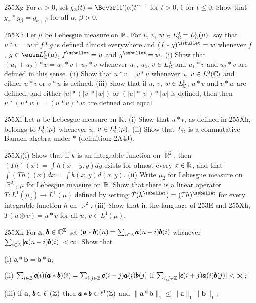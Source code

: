 {\sqheader 255Xg For $\alpha>0$, set
$g_{\alpha}(t)=\Bover1{\Gamma(\alpha)}t^{\alpha-1}$ for $t>0$, $0$ for
$t\le 0$.   Show that $g_{\alpha}*g_{\beta}=g_{\alpha+\beta}$ for all
$\alpha$, $\beta>0$.   

\sqheader 255Xh Let $\mu$ be Lebesgue measure on $\Bbb R$.
For $u$, $v$,
$w\in L^0_{\Bbb C}=L^0_{\Bbb C}(\mu)$, say that
$u*v=w$ if $f*g$ is defined almost everywhere and $(f*g)^{\ssbullet}=w$
whenever $f$, $g\in\eusm L^0_{\Bbb C}(\mu)$, $f^{\ssbullet}=u$ and
$g^{\ssbullet}=w$.   (i) Show that $(u_1+u_2)*v=u_1*v+u_2*v$ whenever
$u_1$, $u_2$, $v\in L^0_{\Bbb C}$ and $u_1*v$ and $u_2*v$ are defined in
this sense.   (ii) Show that $u*v=v*u$ whenever $u$, $v\in L^0(\Bbb C)$ and
either $u*v$ or $v*u$ is defined.   (iii) Show that if $u$, $v$,
$w\in L^0_{\Bbb C}$, $u*v$ and $v*w$ are defined,
and either $|u|*(|v|*|w|)$ or $(|u|*|v|)*|w|$ is
defined, then then $u*(v*w)=(u*v)*w$ are defined and equal.

\sqheader 255Xi Let $\mu$ be Lebesgue measure on $\Bbb R$.
(i) Show that $u*v$, as defined in 255Xh, belongs to $L^1_{\Bbb C}(\mu)$
whenever $u$, $v\in L^1_{\Bbb C}(\mu)$.
(ii) Show that $L^1_{\Bbb C}$ is a
commutative Banach algebra under $*$ (definition: 2A4J).

\spheader 255Xj(i) Show that if $h$ is an integrable
function on $\BbbR^2$, then   $(Th)(x)=\int h(x-y,y)dy$ exists for
almost every $x\in\Bbb R$, and that $\int (Th)(x)dx=\int h(x,y)d(x,y)$.
(ii) Write $\mu_2$ for Lebesgue measure on $\BbbR^2$, $\mu$ for
Lebesgue measure on $\Bbb R$.   Show that there is a linear operator
$\tilde T:L^1(\mu_2)\to L^1(\mu)$ defined by setting
$\tilde T(h^{\ssbullet})=(Th)^{\ssbullet}$ for every integrable function
$h$ on $\BbbR^2$.   (iii) Show that in the language of 253E and 255Xh,
$\tilde T(u\otimes v)=u*v$ for all $u$, $v\in L^1(\mu)$.

\sqheader 255Xk  For $\pmb{a}$, $\pmb{b}\in\Bbb C^{\Bbb Z}$ set
$(\pmb{a}*\pmb{b})(n)=\sum_{i\in\Bbb Z}\pmb{a}(n-i)\pmb{b}(i)$ whenever
$\sum_{i\in\Bbb Z}|\pmb{a}(n-i)\pmb{b}(i)|<\infty$.   Show that

\quad (i) $\pmb{a}*\pmb{b}=\pmb{b}*\pmb{a}$;

\quad (ii) $\sum_{i\in\Bbb Z}\pmb{c}(i)(\pmb{a}*\pmb{b})(i)
=\sum_{i,j\in\Bbb Z}\pmb{c}(i+j)\pmb{a}(i)\pmb{b}(j)$ if
$\sum_{i,j\in\Bbb Z}|\pmb{c}(i+j)\pmb{a}(i)\pmb{b}(j)|<\infty$;

\quad (iii) if $\pmb{a}$, $\pmb{b}\in\ell^1(\Bbb Z)$ then
$\pmb{a}*\pmb{b}\in\ell^1(\Bbb Z)$ and
$\|\pmb{a}*\pmb{b}\|_1\le\|\pmb{a}\|_1\|\pmb{b}\|_1$;

}
